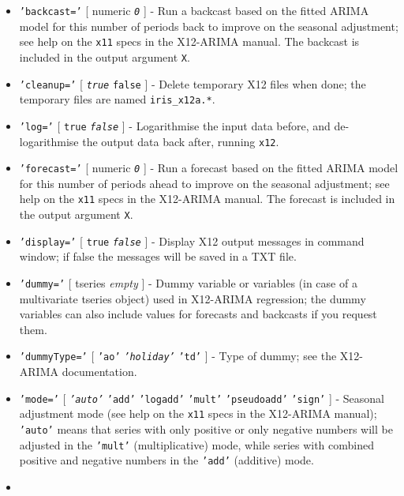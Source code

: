  \begin{itemize}
 \item
   \texttt{'backcast='} {[} numeric \textbar{} \emph{\texttt{0}} {]} -
   Run a backcast based on the fitted ARIMA model for this number of
   periods back to improve on the seasonal adjustment; see help on the
   \texttt{x11} specs in the X12-ARIMA manual. The backcast is included
   in the output argument \texttt{X}.
 \item
   \texttt{'cleanup='} {[} \emph{\texttt{true}} \textbar{} \texttt{false}
   {]} - Delete temporary X12 files when done; the temporary files are
   named \texttt{iris\_x12a.*}.
 \item
   \texttt{'log='} {[} \texttt{true} \textbar{} \emph{\texttt{false}} {]}
   - Logarithmise the input data before, and de-logarithmise the output
   data back after, running \texttt{x12}.
 \item
   \texttt{'forecast='} {[} numeric \textbar{} \emph{\texttt{0}} {]} -
   Run a forecast based on the fitted ARIMA model for this number of
   periods ahead to improve on the seasonal adjustment; see help on the
   \texttt{x11} specs in the X12-ARIMA manual. The forecast is included
   in the output argument \texttt{X}.
 \item
   \texttt{'display='} {[} \texttt{true} \textbar{} \emph{\texttt{false}}
   {]} - Display X12 output messages in command window; if false the
   messages will be saved in a TXT file.
 \item
   \texttt{'dummy='} {[} tseries \textbar{} \emph{empty} {]} - Dummy
   variable or variables (in case of a multivariate tseries object) used
   in X12-ARIMA regression; the dummy variables can also include values
   for forecasts and backcasts if you request them.
 \item
   \texttt{'dummyType='} {[} \texttt{'ao'} \textbar{}
   \emph{\texttt{'holiday'}} \textbar{} \texttt{'td'} {]} - Type of
   dummy; see the X12-ARIMA documentation.
 \item
   \texttt{'mode='} {[} \emph{\texttt{'auto'}} \textbar{} \texttt{'add'}
   \textbar{} \texttt{'logadd'} \textbar{} \texttt{'mult'} \textbar{}
   \texttt{'pseudoadd'} \textbar{} \texttt{'sign'} {]} - Seasonal
   adjustment mode (see help on the \texttt{x11} specs in the X12-ARIMA
   manual); \texttt{'auto'} means that series with only positive or only
   negative numbers will be adjusted in the \texttt{'mult'}
   (multiplicative) mode, while series with combined positive and
   negative numbers in the \texttt{'add'} (additive) mode.
 \item

\end{itemize}
